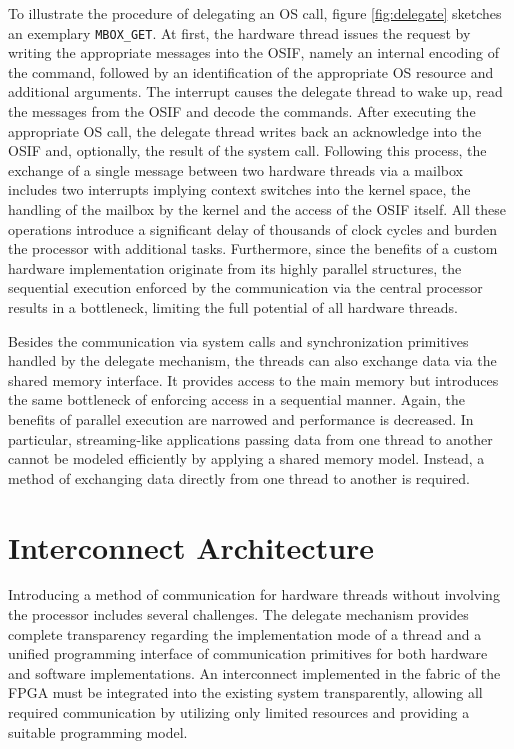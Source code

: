 To illustrate the procedure of delegating an \ac{OS} call, figure
\ref{fig:delegate} sketches an exemplary \lstinline{MBOX_GET}. At first, the
hardware thread issues the request by writing the appropriate messages into
the \ac{OSIF}, namely an internal encoding of the command, followed by an
identification of the appropriate \ac{OS} resource and additional arguments.
The interrupt causes the delegate thread to wake up, read the messages from
the \ac{OSIF} and decode the commands. After executing the appropriate \ac{OS}
call, the delegate thread writes back an acknowledge into the \ac{OSIF} and,
optionally, the result of the system call. Following this process, the
exchange of a single message between two hardware threads via a mailbox
includes two interrupts implying context switches into the kernel space, the
handling of the mailbox by the kernel and the access of the \ac{OSIF} itself.
All these operations introduce a significant delay of thousands of clock
cycles and burden the processor with additional tasks. Furthermore, since the
benefits of a custom hardware implementation originate from its highly
parallel structures, the sequential execution enforced by the communication
via the central processor results in a bottleneck, limiting the full potential
of all hardware threads.

Besides the communication via system calls and synchronization primitives
handled by the delegate mechanism, the threads can also exchange data via the
shared memory interface. It provides access to the main memory but introduces
the same bottleneck of enforcing access in a sequential manner. Again, the
benefits of parallel execution are narrowed and performance is decreased. In
particular, streaming-like applications passing data from one thread to
another cannot be modeled efficiently by applying a shared memory model.
Instead, a method of exchanging data directly from one thread to another is
required.

\section{Interconnect Architecture}

Introducing a method of communication for hardware threads without involving
the processor includes several challenges. The delegate mechanism provides
complete transparency regarding the implementation mode of a thread and a
unified programming interface of communication primitives for both hardware
and software implementations. An interconnect implemented in the fabric of the
\ac{FPGA} must be integrated into the existing system transparently, allowing
all required communication by utilizing only limited resources and providing a
suitable programming model.

